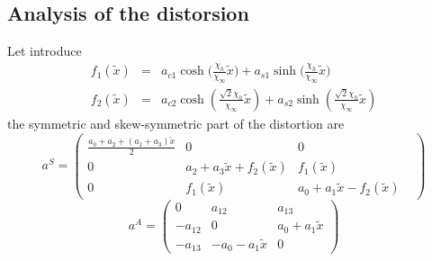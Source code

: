 \documentclass[
10pt, %
a4paper, %
oneside, %
headinclude,footinclude, %
table
]{scrartcl}
\begin{document}
\subsection{Analysis of the distorsion}
Let introduce
$$
\begin{array}{rcl}
f_{1}(\tilde{x})	&=&	a_{c1}\cosh{(\frac{\chi_{h}}{\chi_{\infty}}\tilde{x}})+a_{s1}\sinh{(\frac{\chi_{h}}{\chi_{\infty}}\tilde{x}})\\
f_{2}(\tilde{x})	&=&	a_{c2} \cosh (\frac{\sqrt{2} 
   \chi _h}{\chi _{\infty }}\tilde{x})+a_{s2} \sinh (\frac{\sqrt{2} \chi _h}{\chi
   _{\infty }}\tilde{x}) 
\end{array}
$$
the symmetric and skew-symmetric part of the distortion are
$$
a^{S}=\begin{pmatrix}
\frac{a_{0}+a_{2}+(a_{1}+a_{3})\tilde{x}}{2}&0&0\\
0	&a_{2}+a_{3}\tilde{x}+f_{2}(\tilde{x})&f_{1}(\tilde{x})\\
0	&f_{1}(\tilde{x})		&	a_{0}+a_{1}\tilde{x}-f_{2}(\tilde{x})&\end{pmatrix}
$$
$$
a^{A}=\begin{pmatrix}
0&a_{12}&a_{13}\\
-a_{12}&0	&a_{0}+a_{1}\tilde{x}\\
-a_{13}&-a_{0}-a_{1}\tilde{x}	&0\end{pmatrix}
$$
\end{document}
